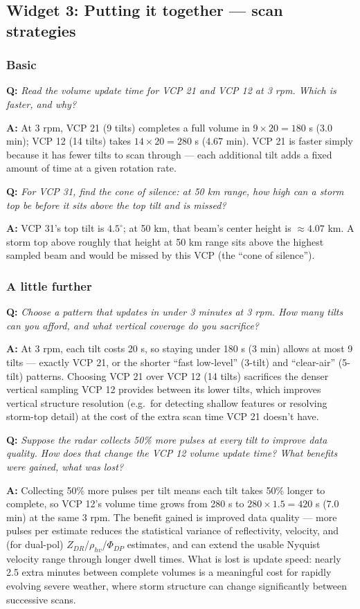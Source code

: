 \documentclass[11pt]{article}
\newenvironment{qa}[1]{\par\noindent\textbf{\color{qgray}Q: }\emph{#1}\par\noindent\textbf{A: }}{\par\vspace{6pt}}
\newcommand{\tier}[1]{\subsubsection*{#1}}
\begin{document}
\subsection{Widget 3: Putting it together --- scan strategies}

\tier{Basic}
\begin{qa}{Read the volume update time for VCP 21 and VCP 12 at 3 rpm. Which is faster, and why?}
At 3 rpm, VCP 21 (9 tilts) completes a full volume in $9\times20=180$ s (3.0 min); VCP 12 (14 tilts) takes $14\times20=280$ s (4.67 min). VCP 21 is faster simply because it has fewer tilts to scan through --- each additional tilt adds a fixed amount of time at a given rotation rate.
\end{qa}
\begin{qa}{For VCP 31, find the cone of silence: at 50 km range, how high can a storm top be before it sits above the top tilt and is missed?}
VCP 31's top tilt is $4.5^\circ$; at 50 km, that beam's center height is $\approx4.07$ km. A storm top above roughly that height at 50 km range sits above the highest sampled beam and would be missed by this VCP (the ``cone of silence'').
\end{qa}

\tier{A little further}
\begin{qa}{Choose a pattern that updates in under 3 minutes at 3 rpm. How many tilts can you afford, and what vertical coverage do you sacrifice?}
At 3 rpm, each tilt costs 20 s, so staying under 180 s (3 min) allows at most 9 tilts --- exactly VCP 21, or the shorter ``fast low-level'' (3-tilt) and ``clear-air'' (5-tilt) patterns. Choosing VCP 21 over VCP 12 (14 tilts) sacrifices the denser vertical sampling VCP 12 provides between its lower tilts, which improves vertical structure resolution (e.g.\ for detecting shallow features or resolving storm-top detail) at the cost of the extra scan time VCP 21 doesn't have.
\end{qa}
\begin{qa}{Suppose the radar collects 50\% more pulses at every tilt to improve data quality. How does that change the VCP 12 volume update time? What benefits were gained, what was lost?}
Collecting 50\% more pulses per tilt means each tilt takes 50\% longer to complete, so VCP 12's volume time grows from 280 s to $280\times1.5=420$ s (7.0 min) at the same 3 rpm. The benefit gained is improved data quality --- more pulses per estimate reduces the statistical variance of reflectivity, velocity, and (for dual-pol) $Z_{DR}$/$\rho_{hv}$/$\Phi_{DP}$ estimates, and can extend the usable Nyquist velocity range through longer dwell times. What is lost is update speed: nearly 2.5 extra minutes between complete volumes is a meaningful cost for rapidly evolving severe weather, where storm structure can change significantly between successive scans.
\end{qa}
\end{document}
